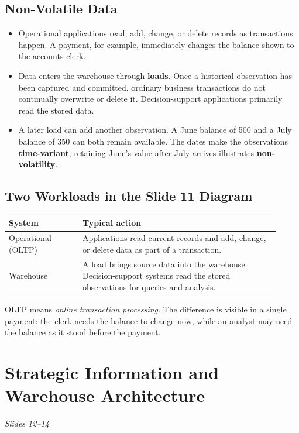 \documentclass[12pt,a4paper]{article}
\newcommand{\slides}[1]{\textit{\small #1}\par}
\newcommand{\rowgap}{\\[4pt]}
\begin{document}
\subsection{Non-Volatile Data}
\begin{itemize}
\item Operational applications read, add, change, or delete records as transactions happen. A payment, for example, immediately changes the balance shown to the accounts clerk.
\item Data enters the warehouse through \textbf{loads}. Once a historical observation has been captured and committed, ordinary business transactions do not continually overwrite or delete it. Decision-support applications primarily read the stored data.
\item A later load can add another observation. A June balance of 500 and a July balance of 350 can both remain available. The dates make the observations \textbf{time-variant}; retaining June's value after July arrives illustrates \textbf{non-volatility}.
\end{itemize}

\subsection{Two Workloads in the Slide 11 Diagram}
\begin{center}\small
\begin{tabular}{@{}p{0.25\linewidth}p{0.67\linewidth}@{}}
\hline
\textbf{System} & \textbf{Typical action}\\ \hline
Operational (OLTP) & Applications read current records and add, change, or delete data as part of a transaction.\rowgap
Warehouse & A load brings source data into the warehouse. Decision-support systems read the stored observations for queries and analysis.\\ \hline
\end{tabular}
\end{center}
OLTP means \textit{online transaction processing}. The difference is visible in a single payment: the clerk needs the balance to change now, while an analyst may need the balance as it stood before the payment.

\newpage
\section{Strategic Information and Warehouse Architecture}
\slides{Slides 12--14}
\end{document}
